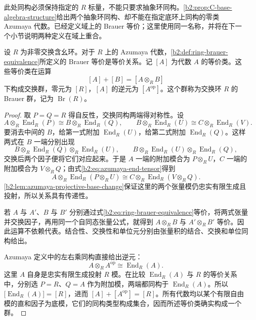 此处同构必须保持指定的 \(R\) 标量，不能只要求抽象环同构。\cref{b2:prop:C-base-algebra-structure}给出两个抽象环同构、却不能在指定底环上同构的零类 Azumaya 代数。已经定义域上的 Brauer 等价；这里使用同一名称，并将在下一个小节说明两种定义在域上重合。

\begin{theorem}\label{b2:thm:ring-brauer-group}
	设 \(R\) 为非零交换含幺环。对于 \(R\) 上的 Azumaya 代数，\cref{b2:def:ring-brauer-equivalence}所定义的 Brauer 等价是等价关系。记 \([A]\) 为代数 \(A\) 的等价类。这些等价类在运算
	\[
		[A]+[B]=[A\otimes_RB]
	\]
	下构成交换群，零元为 \([R]\)，\([A]\) 的逆元为 \([A^{\mathrm{op}}]\)。这个群称为交换环 \(R\) 的 Brauer 群，记为 \(\operatorname{Br}(R)\)。
\end{theorem}
\begin{proof}
	取 \(P=Q=R\) 得自反性，交换同构两端得对称性。设
	\[
		A\otimes_R\operatorname{End}_R(P)\cong B\otimes_R\operatorname{End}_R(Q), \qquad B\otimes_R\operatorname{End}_R(U)\cong C\otimes_R\operatorname{End}_R(V).
	\]
	要消去中间的 \(B\)，给第一式附加 \(\operatorname{End}_R(U)\)，给第二式附加 \(\operatorname{End}_R(Q)\)。这样两式在 \(B\) 一端分别出现
	\[
		B\otimes_R\operatorname{End}_R(Q)\otimes_R\operatorname{End}_R(U), \qquad B\otimes_R\operatorname{End}_R(U)\otimes_R\operatorname{End}_R(Q),
	\]
	交换后两个因子便将它们对应起来。于是 \(A\) 一端的附加模合为 \(P\otimes_RU\)，\(C\) 一端的附加模合为 \(V\otimes_RQ\)；由式\eqref{b2:eq:azumaya-end-tensor}得到
	\[
		A\otimes_R\operatorname{End}_R(P\otimes_RU) \cong C\otimes_R\operatorname{End}_R(V\otimes_RQ).
	\]
	\cref{b2:lem:azumaya-projective-base-change}保证这里的两个张量模仍忠实有限生成且投射，所以关系具有传递性。

	若 \(A\) 与 \(A'\)、\(B\) 与 \(B'\) 分别通过式\eqref{b2:eq:ring-brauer-equivalence}等价，将两式张量并交换因子，再用同一个自同态张量公式，就得到 \(A\otimes_RB\) 与 \(A'\otimes_RB'\) 等价。因此运算不依赖代表。结合性、交换性和单位元分别由张量积的结合、交换和单位同构给出。

	Azumaya 定义中的左右乘同构直接给出逆元：
	\[
		A\otimes_RA^{\mathrm{op}}\cong\operatorname{End}_R(A).
	\]
	这里 \(A\) 自身是忠实有限生成投射 \(R\) 模。在比较 \(\operatorname{End}_R(A)\) 与 \(R\) 的等价关系中，分别选 \(P=R\)、\(Q=A\) 作为附加模，两端都同构于 \(\operatorname{End}_R(A)\)。所以 \(\bigl[\operatorname{End}_R(A)\bigr]=[R]\)，进而 \([A]+[A^{\mathrm{op}}]=[R]\)。所有代数均以某个有限自由模的直和因子为底模，它们的同构类型构成集合，因而所述等价类确实构成一个群。
\end{proof}

